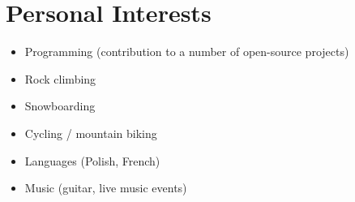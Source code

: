 \documentclass{cv}
\begin{document}

\section{Personal Interests}

\begin{itemize}
\item Programming (contribution to a number of open-source projects)
\item Rock climbing
\item Snowboarding
\item Cycling / mountain biking
\item Languages (Polish, French)
\item Music (guitar, live music events)
\end{itemize}
\end{document}
